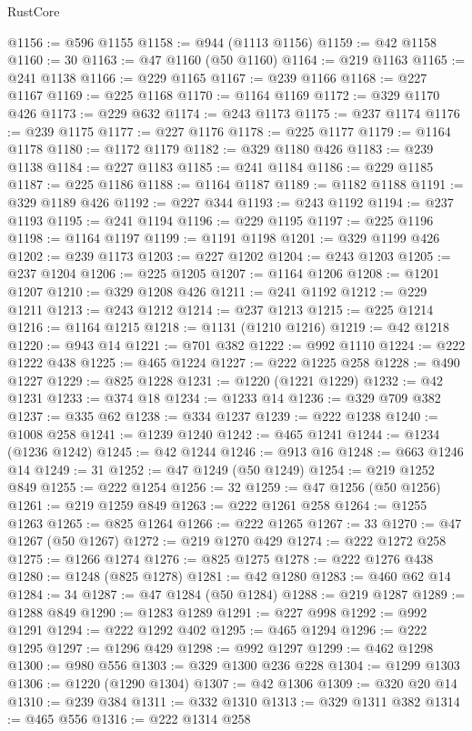 \begin{lexlean}{RustCore}
\begin{coremodule}
@1156 := @596 @1155
@1158 := @944 (@1113 @1156)
@1159 := @42 @1158
@1160 := 30
@1163 := @47 @1160 (@50 @1160)
@1164 := @219 @1163
@1165 := @241 @1138
@1166 := @229 @1165
@1167 := @239 @1166
@1168 := @227 @1167
@1169 := @225 @1168
@1170 := @1164 @1169
@1172 := @329 @1170 @426
@1173 := @229 @632
@1174 := @243 @1173
@1175 := @237 @1174
@1176 := @239 @1175
@1177 := @227 @1176
@1178 := @225 @1177
@1179 := @1164 @1178
@1180 := @1172 @1179
@1182 := @329 @1180 @426
@1183 := @239 @1138
@1184 := @227 @1183
@1185 := @241 @1184
@1186 := @229 @1185
@1187 := @225 @1186
@1188 := @1164 @1187
@1189 := @1182 @1188
@1191 := @329 @1189 @426
@1192 := @227 @344
@1193 := @243 @1192
@1194 := @237 @1193
@1195 := @241 @1194
@1196 := @229 @1195
@1197 := @225 @1196
@1198 := @1164 @1197
@1199 := @1191 @1198
@1201 := @329 @1199 @426
@1202 := @239 @1173
@1203 := @227 @1202
@1204 := @243 @1203
@1205 := @237 @1204
@1206 := @225 @1205
@1207 := @1164 @1206
@1208 := @1201 @1207
@1210 := @329 @1208 @426
@1211 := @241 @1192
@1212 := @229 @1211
@1213 := @243 @1212
@1214 := @237 @1213
@1215 := @225 @1214
@1216 := @1164 @1215
@1218 := @1131 (@1210 @1216)
@1219 := @42 @1218
@1220 := @943 @14
@1221 := @701 @382
@1222 := @992 @1110
@1224 := @222 @1222 @438
@1225 := @465 @1224
@1227 := @222 @1225 @258
@1228 := @490 @1227
@1229 := @825 @1228
@1231 := @1220 (@1221 @1229)
@1232 := @42 @1231
@1233 := @374 @18
@1234 := @1233 @14
@1236 := @329 @709 @382
@1237 := @335 @62
@1238 := @334 @1237
@1239 := @222 @1238
@1240 := @1008 @258
@1241 := @1239 @1240
@1242 := @465 @1241
@1244 := @1234 (@1236 @1242)
@1245 := @42 @1244
@1246 := @913 @16
@1248 := @663 @1246 @14
@1249 := 31
@1252 := @47 @1249 (@50 @1249)
@1254 := @219 @1252 @849
@1255 := @222 @1254
@1256 := 32
@1259 := @47 @1256 (@50 @1256)
@1261 := @219 @1259 @849
@1263 := @222 @1261 @258
@1264 := @1255 @1263
@1265 := @825 @1264
@1266 := @222 @1265
@1267 := 33
@1270 := @47 @1267 (@50 @1267)
@1272 := @219 @1270 @429
@1274 := @222 @1272 @258
@1275 := @1266 @1274
@1276 := @825 @1275
@1278 := @222 @1276 @438
@1280 := @1248 (@825 @1278)
@1281 := @42 @1280
@1283 := @460 @62 @14
@1284 := 34
@1287 := @47 @1284 (@50 @1284)
@1288 := @219 @1287
@1289 := @1288 @849
@1290 := @1283 @1289
@1291 := @227 @998
@1292 := @992 @1291
@1294 := @222 @1292 @402
@1295 := @465 @1294
@1296 := @222 @1295
@1297 := @1296 @429
@1298 := @992 @1297
@1299 := @462 @1298
@1300 := @980 @556
@1303 := @329 @1300 @236 @228
@1304 := @1299 @1303
@1306 := @1220 (@1290 @1304)
@1307 := @42 @1306
@1309 := @320 @20 @14
@1310 := @239 @384
@1311 := @332 @1310
@1313 := @329 @1311 @382
@1314 := @465 @556
@1316 := @222 @1314 @258

\end{coremodule}
\end{lexlean}
